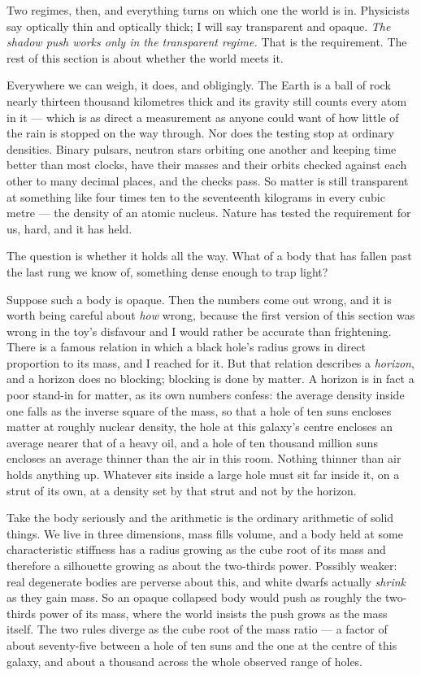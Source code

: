 \documentclass[fontsize=11pt,paper=a4,pagesize=auto,parskip=half-]{scrbook}
\begin{document}
Two regimes, then, and everything turns on which one the world is in. Physicists say optically thin and optically thick; I will say transparent and opaque. \emph{The shadow push works only in the transparent regime.} That is the requirement. The rest of this section is about whether the world meets it.

Everywhere we can weigh, it does, and obligingly. The Earth is a ball of rock nearly thirteen thousand kilometres thick and its gravity still counts every atom in it --- which is as direct a measurement as anyone could want of how little of the rain is stopped on the way through. Nor does the testing stop at ordinary densities. Binary pulsars, neutron stars orbiting one another and keeping time better than most clocks, have their masses and their orbits checked against each other to many decimal places, and the checks pass. So matter is still transparent at something like four times ten to the seventeenth kilograms in every cubic metre --- the density of an atomic nucleus. Nature has tested the requirement for us, hard, and it has held.

The question is whether it holds all the way. What of a body that has fallen past the last rung we know of, something dense enough to trap light?

Suppose such a body is opaque. Then the numbers come out wrong, and it is worth being careful about \emph{how} wrong, because the first version of this section was wrong in the toy's disfavour and I would rather be accurate than frightening. There is a famous relation in which a black hole's radius grows in direct proportion to its mass, and I reached for it. But that relation describes a \emph{horizon}, and a horizon does no blocking; blocking is done by matter. A horizon is in fact a poor stand-in for matter, as its own numbers confess: the average density inside one falls as the inverse square of the mass, so that a hole of ten suns encloses matter at roughly nuclear density, the hole at this galaxy's centre encloses an average nearer that of a heavy oil, and a hole of ten thousand million suns encloses an average thinner than the air in this room. Nothing thinner than air holds anything up. Whatever sits inside a large hole must sit far inside it, on a strut of its own, at a density set by that strut and not by the horizon.

Take the body seriously and the arithmetic is the ordinary arithmetic of solid things. We live in three dimensions, mass fills volume, and a body held at some characteristic stiffness has a radius growing as the cube root of its mass and therefore a silhouette growing as about the two-thirds power. Possibly weaker: real degenerate bodies are perverse about this, and white dwarfs actually \emph{shrink} as they gain mass. So an opaque collapsed body would push as roughly the two-thirds power of its mass, where the world insists the push grows as the mass itself. The two rules diverge as the cube root of the mass ratio --- a factor of about seventy-five between a hole of ten suns and the one at the centre of this galaxy, and about a thousand across the whole observed range of holes.
\end{document}
